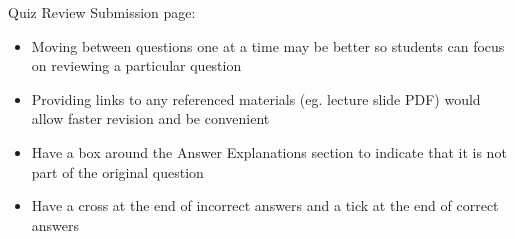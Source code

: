 Quiz Review Submission page:
\begin{itemize}
	\item Moving between questions one at a time may be better so students can focus on reviewing a particular question
	\item Providing links to any referenced materials (eg. lecture slide PDF) would allow faster revision and be convenient
	\item Have a box around the Answer Explanations section to indicate that it is not part of the original question
	\item Have a cross at the end of incorrect answers and a tick at the end of correct answers
\end{itemize}
